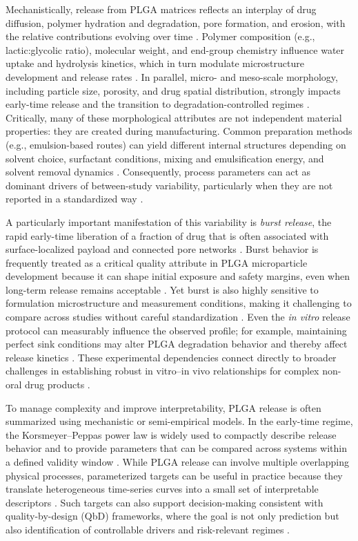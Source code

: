 \documentclass[preprint,12pt,authoryear]{elsarticle}
\begin{document}
Mechanistically, release from PLGA matrices reflects an interplay of drug diffusion, polymer hydration and degradation, pore formation, and erosion, with the relative contributions evolving over time \citep{Fredenberg2011}. Polymer composition (e.g., lactic:glycolic ratio), molecular weight, and end-group chemistry influence water uptake and hydrolysis kinetics, which in turn modulate microstructure development and release rates \citep{MakadiaSiegel2011,Fredenberg2011}. In parallel, micro- and meso-scale morphology, including particle size, porosity, and drug spatial distribution, strongly impacts early-time release and the transition to degradation-controlled regimes \citep{Fredenberg2011}. Critically, many of these morphological attributes are not independent material properties: they are created during manufacturing. Common preparation methods (e.g., emulsion-based routes) can yield different internal structures depending on solvent choice, surfactant conditions, mixing and emulsification energy, and solvent removal dynamics \citep{Jain2000}. Consequently, process parameters can act as dominant drivers of between-study variability, particularly when they are not reported in a standardized way \citep{Jain2000,Fredenberg2011}.

A particularly important manifestation of this variability is \emph{burst release}, the rapid early-time liberation of a fraction of drug that is often associated with surface-localized payload and connected pore networks \citep{Yoo2020Burst}. Burst behavior is frequently treated as a critical quality attribute in PLGA microparticle development because it can shape initial exposure and safety margins, even when long-term release remains acceptable \citep{Yoo2020Burst,ICHQ8R2}. Yet burst is also highly sensitive to formulation microstructure and measurement conditions, making it challenging to compare across studies without careful standardization \citep{Yoo2020Burst,Fredenberg2011}. Even the \emph{in vitro} release protocol can measurably influence the observed profile; for example, maintaining perfect sink conditions may alter PLGA degradation behavior and thereby affect release kinetics \citep{Klose2011Sink}. These experimental dependencies connect directly to broader challenges in establishing robust in vitro--in vivo relationships for complex non-oral drug products \citep{ShenBurgess2015}.

To manage complexity and improve interpretability, PLGA release is often summarized using mechanistic or semi-empirical models. In the early-time regime, the Korsmeyer--Peppas power law is widely used to compactly describe release behavior and to provide parameters that can be compared across systems within a defined validity window \citep{Korsmeyer1983,RitgerPeppas1987}. While PLGA release can involve multiple overlapping physical processes, parameterized targets can be useful in practice because they translate heterogeneous time-series curves into a small set of interpretable descriptors \citep{Fredenberg2011}. Such targets can also support decision-making consistent with quality-by-design (QbD) frameworks, where the goal is not only prediction but also identification of controllable drivers and risk-relevant regimes \citep{ICHQ8R2}.
\end{document}
